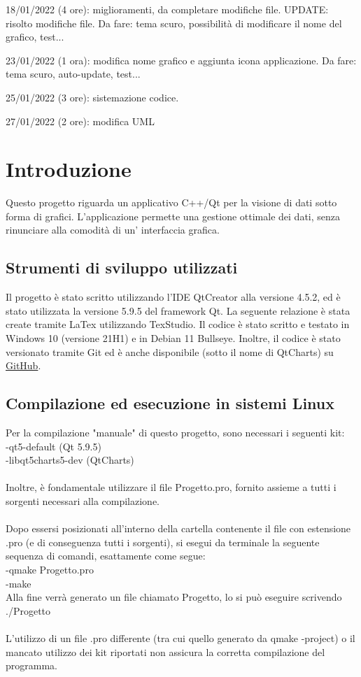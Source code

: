 \documentclass[10pt]{article}
\begin{document}
    18/01/2022 (4 ore): miglioramenti, da completare modifiche file. UPDATE: risolto modifiche file. Da fare: tema scuro, possibilità di modificare il nome del grafico, test...
    
    23/01/2022 (1 ora): modifica nome grafico e aggiunta icona applicazione. Da fare: tema scuro, auto-update, test...
    
    25/01/2022 (3 ore): sistemazione codice.
    
    27/01/2022 (2 ore): modifica UML
    
    \newpage
    \hypersetup{hidelinks}
    \tableofcontents
    \newpage
    \section{Introduzione}
     Questo progetto riguarda un applicativo C++/Qt per la visione di dati sotto forma di grafici. L'applicazione permette una gestione ottimale dei dati, senza rinunciare alla comodità di un' interfaccia grafica.
    \subsection{Strumenti di sviluppo utilizzati}
    Il progetto è stato scritto utilizzando l'IDE QtCreator alla versione 4.5.2, ed è stato utilizzata la versione 5.9.5 del framework Qt. 
    La seguente relazione è stata create tramite LaTex utilizzando TexStudio.
    Il codice è stato scritto e testato in Windows 10 (versione 21H1) e in Debian 11 Bullseye.
    Inoltre, il codice è stato versionato tramite Git ed è anche disponibile (sotto il nome di QtCharts) su \href{https://github.com/nicolabaesso/qtCharts}{GitHub}.
    \subsection{Compilazione ed esecuzione in sistemi Linux}
    Per la compilazione "manuale" di questo progetto, sono necessari i seguenti kit:\\
    -qt5-default (Qt 5.9.5)\\
    -libqt5charts5-dev (QtCharts)
    \\
    \\
    Inoltre, è fondamentale utilizzare il file Progetto.pro, fornito assieme a tutti i sorgenti necessari alla compilazione.\\
    \\
    Dopo essersi posizionati all'interno della cartella contenente il file con estensione .pro (e di conseguenza tutti i sorgenti), si esegui da terminale la seguente sequenza di comandi, esattamente come segue:\\
    -qmake Progetto.pro\\
    -make
    \\
    Alla fine verrà generato un file chiamato Progetto, lo si può eseguire scrivendo ./Progetto\\\\
    L'utilizzo di un file .pro differente (tra cui quello generato da qmake -project) o il mancato utilizzo dei kit riportati non assicura la corretta compilazione del programma.
\end{document}

